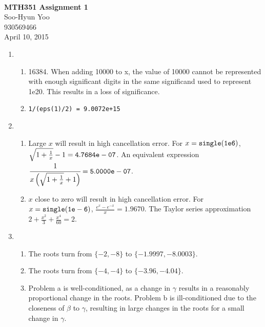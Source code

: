 \documentclass[12pt,letterpaper]{article}
\begin{document}
\fancyfoot{}
\begin{center}
  \hfill \\
  \vspace{4in}
  {\bf\Huge MTH351 Assignment 1} \\
  \vspace{2in}
  {\Large Soo-Hyun Yoo \\ 930569466 \\ April 10, 2015}
\end{center}

\newpage
{}

\begin{enumerate}
  \item
    \begin{enumerate}
      \item 16384. When adding 10000 to x, the value of 10000 cannot be
        represented with enough significant digits in the same significand used
        to represent 1e20. This results in a loss of significance.
      \item {\tt 1/(eps(1)/2) = 9.0072e+15}
    \end{enumerate}
  \item
    \begin{enumerate}
      \item Large $x$ will result in high cancellation error. For
        $x={\tt single(1e6)}$, $\sqrt{1+\frac{1}{x}}-1 = {\tt 4.7684e-07}$. An
        equivalent expression $\cfrac{1}{x\left(\sqrt{1+\frac{1}{x}}+1\right)}
        = {\tt
        5.0000e-07}$.
      \item $x$ close to zero will result in high cancellation error. For
        $x={\tt single(1e-6)}$, $\frac{e^x-e^{-x}}{x} = 1.9670$. The Taylor
        series approximation $2+\frac{x^2}{3}+\frac{x^4}{60} = 2$.
    \end{enumerate}
  \item
    \begin{enumerate}
      \item The roots turn from $\{-2, -8\}$ to $\{-1.9997, -8.0003\}$.
      \item The roots turn from $\{-4, -4\}$ to $\{-3.96, -4.04\}$.
      \item Problem a is well-conditioned, as a change in $\gamma$ results in
        a reasonably proportional change in the roots. Problem b is
        ill-conditioned due to the closeness of $\beta$ to $\gamma$, resulting
        in large changes in the roots for a small change in $\gamma$.

\end{enumerate}
\end{enumerate}
\end{document}
